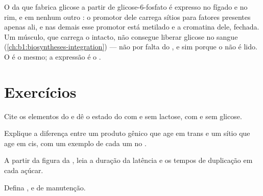 \begin{example}\label{ex:b1:expression-control:twoorgans}
O  da  que fabrica glicose a partir de glicose-6-fosfato é
expresso no fígado e no rim, e em nenhum outro : o promotor dele
carrega sítios para fatores presentes apenas ali, e nas demais 
esse promotor está metilado e a cromatina dele, fechada. Um músculo, que
carrega o  intacto, não consegue liberar glicose no sangue
(\cref{ch:b1:biosyntheses-integration}) --- não por falta do , e sim
porque o  não é lido. O  é o mesmo; a expressão é o .
\end{example}

\section{Exercícios}

\begin{exercise}[$\star$]\label{exo:b1:expression-control:1}
Cite os elementos do  e dê o estado do  com e sem
lactose, com e sem glicose.
\end{exercise}

\begin{exercise}[$\star$]\label{exo:b1:expression-control:2}
Explique a diferença entre um produto gênico que age em trans e um sítio
que age em cis, com um exemplo de cada um no .
\end{exercise}

\begin{exercise}[$\star$]\label{exo:b1:expression-control:3}
A partir da figura da , leia a duração da latência e os tempos de
duplicação em cada açúcar.
\end{exercise}

\begin{exercise}[$\star$]\label{exo:b1:expression-control:4}
Defina ,  e  de manutenção.
\end{exercise}

